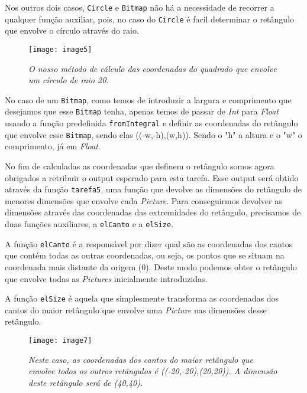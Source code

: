 \documentclass[a4paper,12pt]{report}
\begin{document}
Nos outros dois casos, {\footnotesize\tt Circle} e {\footnotesize\tt Bitmap} não há a necessidade de recorrer a qualquer função auxiliar, pois, no caso do {\footnotesize\tt Circle} é facil determinar o retângulo que envolve o círculo através do raio.

\begin{figure}[h]
	\centering
	\texttt{[image: image5]}
	\caption{\small\sl O nosso método de cálculo das coordenadas do quadrado que envolve um círculo de raio 20.}
	\captionsetup[figure]{list=yes}
\end{figure}
No caso de um {\footnotesize\tt Bitmap}, como temos de introduzir a largura e comprimento que desejamos que esse {\footnotesize\tt Bitmap} tenha, apenas temos de passar de {\sl Int} para {\sl Float} usando a função predefinida {\footnotesize\tt fromIntegral} e definir as coordenadas do retângulo que envolve esse {\footnotesize\tt Bitmap}, sendo elas ((-w,-h),(w,h)). Sendo o "h" a altura e o "w" o comprimento, já em {\sl Float}.

No fim de calculadas as coordenadas que definem o retângulo somos agora obrigados a retribuir o output esperado para esta tarefa. Esse output será obtido através da função {\footnotesize\tt tarefa5}, uma função que devolve as dimensões do retângulo de menores dimensões que envolve cada {\sl Picture}. Para conseguirmos devolver as dimensões através das coordenadas das extremidades do retângulo, precisamos de duas funções auxiliares, a {\footnotesize\tt elCanto} e a {\footnotesize\tt elSize}.

A função {\footnotesize\tt elCanto} é a responsável por dizer qual são as coordenadas dos cantos que contém todas as outras coordenadas, ou seja, os pontos que se situam na coordenada mais distante da origem (0). Deste modo podemos obter o retângulo que envolve todas as {\sl Pictures} inicialmente introduzidas. 

A função {\footnotesize\tt elSize} é aquela que simplesmente transforma as coordenadas dos cantos do maior retângulo que envolve uma {\sl Picture} nas dimensões desse retângulo.

\begin{figure}[h]
	\centering
	\texttt{[image: image7]}
	\caption{\small\sl Neste caso, as coordenadas dos cantos do maior retângulo que envolve todos os outros retângulos é ((-20,-20),(20,20)). A dimensão deste retângulo será de (40,40).}
	\captionsetup[figure]{list=yes}
\end{figure}
\end{document}
